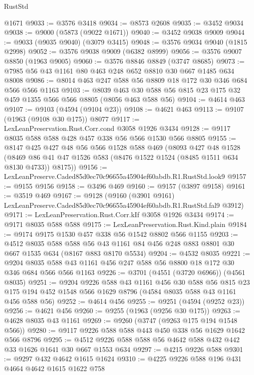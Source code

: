 \begin{lexlean}{RustStd}
\begin{coremodule}
    @1671
@9033 := @3576 @3418
@9034 := @8573 @2608
@9035 := @3452 @9034
@9038 := @9000 (@5873 (@9022 @1671))
@9040 := @3452 @9038 @9009
@9044 := @9033 (@9035 @9040) (@3079 @3415)
@9048 := @3576 @9034 @9040 (@1815 @2998)
@9052 := @3576 @9038 @9009 (@6382 @8999)
@9056 := @3576 @9007 @8850 (@1963 @9005)
@9060 := @3576 @8846 @8849 (@3747 @8685)
@9073 := @7985 @56 @43 @1161 @80 @463 @248 @652 @8810 @30 @667 @1485 @634 @8008
@9086 := @8014 @463 @247 @588 @56 @8809 @18 @172 @30 @346 @684 @566 @566 @1163
@9103 := @8039 @463 @30 @588 @56 @815 @23 @175 @32 @459 @1355 @566 @566 @8805 (@8056 @463 @588 @56)
@9104 := @4614 @463
@9107 := @9103 (@4594 (@9104 @23))
@9108 := @4621 @463
@9113 := @9107 (@1963 (@9108 @30 @175)) @8077
@9117 := LexLeanPreservation.Rust.Corr.cond @3058 @1926 @3434
@9128 := @9117 @8035 @588 @588 @428 @457 @338 @56 @566 @1530 @566 @8805
@9155 := @8147
    @425
    @427
    @48
    @56
    @566
    @1528
    @588
    @469
    (@8093
      @427
      @48
      @1528
      (@8469 @86 @41 @47 @1526 @583 (@8476 @1522 @1524 (@8485 @1511 @634 @8130 @4733)) @8175))
@9156 := LexLeanPreserve.Caded85d0ec70c96655a45904ef60abdb.R1.RustStd.look9
@9157 := @9155 @9156
@9158 := @3496 @469
@9160 := @9157 (@3897 @9158)
@9161 := @3519 @469
@9167 := @9128
    (@9160 (@3901 @9161) LexLeanPreserve.Caded85d0ec70c96655a45904ef60abdb.R1.RustStd.fal9 @3912)
@9171 := LexLeanPreservation.Rust.Corr.kIf @3058 @1926 @3434
@9174 := @9171 @8035 @588 @588
@9175 := LexLeanPreservation.Rust.Kind.plain
@9184 := @9174 @9175 @1530 @457 @338 @56 @1542 @8802 @566 @1155
@9203 := @4512
    @8035
    @588
    @588
    @56
    @43
    @1161
    @84
    @456
    @248
    @883
    @8801
    @30
    @667
    @1535
    @634
    (@8167 @883 @8170 @5534)
@9204 := @4532 @8035
@9221 := @9204 @8035 @588 @43 @1161 @456 @247 @588 @56 @8800 @18 @172 @30 @346 @684 @566 @566 @1163
@9226 := @3701 (@4551 (@3720 @6966)) (@4561 @8035)
@9251 := @9204
    @9226
    @588
    @43
    @1161
    @456
    @30
    @588
    @56
    @815
    @23
    @175
    @194
    @452
    @1548
    @566
    @1629
    @8796
    (@4584 @8035 @588 @43 @1161 @456 @588 @56)
@9252 := @4614 @456
@9255 := @9251 (@4594 (@9252 @23))
@9256 := @4621 @456
@9260 := @9255 (@1963 (@9256 @30 @175))
@9263 := @4628 @8035 @43 @1161
@9269 := @9260 (@3747 (@9263 @175 @194 @1548 @566))
@9280 := @9117 @9226 @588 @588 @443 @450 @338 @56 @1629 @1642 @566 @8796
@9295 := @4512 @9226 @588 @588 @56 @4642 @588 @432 @442 @33 @1626 @1641 @30 @667 @1553 @634
@9297 := @4215 @9226 @588
@9301 := @9297 @432 @4642 @1615 @1624
@9310 := @4225 @9226 @588 @196 @431 @4664 @4642 @1615 @1622 @758

\end{coremodule}
\end{lexlean}
